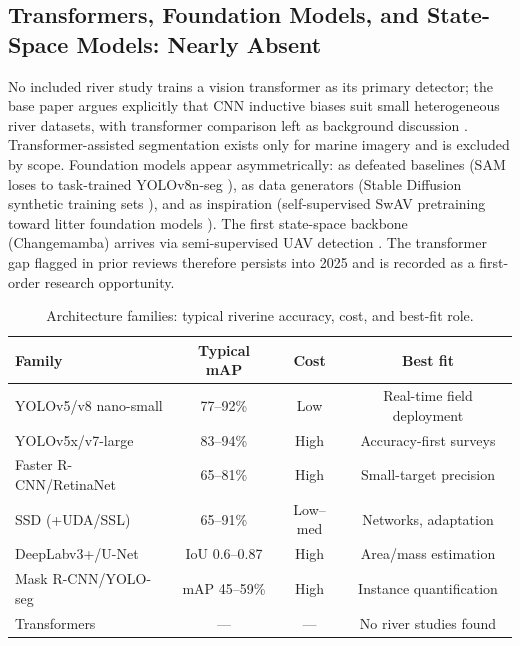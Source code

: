 \subsection{Transformers, Foundation Models, and State-Space Models: Nearly Absent}
No included river study trains a vision transformer as its primary detector; the base paper argues explicitly that CNN inductive biases suit small heterogeneous river datasets, with transformer comparison left as background discussion \cite{Pati2025}. Transformer-assisted segmentation exists only for marine imagery and is excluded by scope. Foundation models appear asymmetrically: as defeated baselines (SAM loses to task-trained YOLOv8n-seg \cite{Pan2024}), as data generators (Stable Diffusion synthetic training sets \cite{Pan2023}), and as inspiration (self-supervised SwAV pretraining toward litter foundation models \cite{JiaSwAV2024}). The first state-space backbone (Changemamba) arrives via semi-supervised UAV detection \cite{Sun2025}. The transformer gap flagged in prior reviews therefore persists into 2025 and is recorded as a first-order research opportunity.

\begin{table}[!t]
\centering
\caption{Architecture families: typical riverine accuracy, cost, and best-fit role.}
\label{tab:archs}
\begin{tabular}{lccc}
\hline
\textbf{Family} & \textbf{Typical mAP} & \textbf{Cost} & \textbf{Best fit} \\
\hline
YOLOv5/v8 nano-small & 77--92\% & Low & Real-time field deployment \\
YOLOv5x/v7-large & 83--94\% & High & Accuracy-first surveys \\
Faster R-CNN/RetinaNet & 65--81\% & High & Small-target precision \\
SSD (+UDA/SSL) & 65--91\% & Low--med & Networks, adaptation \\
DeepLabv3+/U-Net & IoU 0.6--0.87 & High & Area/mass estimation \\
Mask R-CNN/YOLO-seg & mAP 45--59\% & High & Instance quantification \\
Transformers & --- & --- & No river studies found \\
\hline
\end{tabular}
\end{table}
